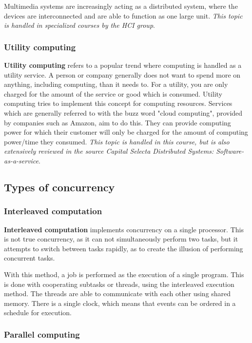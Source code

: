 \documentclass[a4paper]{article}
\begin{document}
Multimedia systems are increasingly acting as a distributed system, where the devices are interconnected and are able to function as one large unit. \textit{This topic is handled in specialized courses by the HCI group}.

\subsubsection{Utility computing}

\textbf{Utility computing} refers to a popular trend where computing is handled as a utility service. A person or company generally does not want to spend more on anything, including computing, than it needs to. For a utility, you are only charged for the amount of the service or good which is consumed. Utility computing tries to implement this concept for computing resources. Services which are generally referred to with the buzz word "cloud computing", provided by companies such as Amazon, aim to do this. They can provide computing power for which their customer will only be charged for the amount of computing power/time they consumed. \textit{This topic is handled in this course, but is also extensively reviewed in the source Capital Selecta Distributed Systems: Software-as-a-service}.

\subsection{Types of concurrency}

\subsubsection{Interleaved computation}

\textbf{Interleaved computation} implements concurrency on a single processor. This is not true concurrency, as it can not simultaneously perform two tasks, but it attempts to switch between tasks rapidly, as to create the illusion of performing concurrent tasks.

With this method, a job is performed as the execution of a single program. This is done with cooperating subtasks or threads, using the interleaved execution method. The threads are able to communicate with each other using shared memory. There is a single clock, which means that events can be ordered in a schedule for execution.

\subsubsection{Parallel computing}
\end{document}

